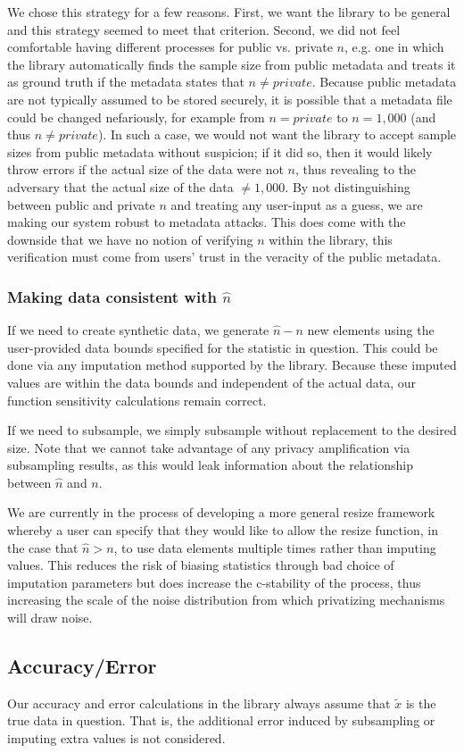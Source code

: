 \documentclass[11pt]{scrartcl} %
\begin{document}
We chose this strategy for a few reasons. First, we want the library to be general and this strategy
seemed to meet that criterion. Second, we did not feel comfortable having different processes for
public vs. private $n$, e.g. one in which the library automatically finds the sample size from public metadata and treats
it as ground truth if the metadata states that $n \neq private$.
Because public metadata are not typically assumed to be stored securely, it is
possible that a metadata file could be changed nefariously, for example from $n = private$ to $n = 1,000$
(and thus $n \neq private$).
In such a case, we would not want the library to accept sample sizes from public metadata without
suspicion; if it did so, then it would likely throw errors if the actual size of the data were not $n$, thus
revealing to the adversary that the actual size of the data $\neq 1,000$.
By not distinguishing between public and private $n$ and treating any user-input as a guess,
we are making our system robust to metadata attacks.
This does come with the downside that we have no notion of verifying $n$ within the library, this
verification must come from users' trust in the veracity of the public metadata.

\subsubsection{Making data consistent with $\hat{n}$}
If we need to create synthetic data, we generate $\hat{n} - n$ new elements using
the user-provided data bounds specified for the statistic in question.
This could be done via any imputation method supported by the library.
Because these imputed values are within the data bounds and independent of the actual data,
our function sensitivity calculations remain correct. \newline

If we need to subsample, we simply subsample without replacement to the desired size.
Note that we cannot take advantage of any privacy amplification via subsampling results,
as this would leak information about the relationship between $\hat{n}$ and $n$. \newline 

We are currently in the process of developing a more general resize framework whereby a user can specify that they would 
like to allow the resize function, in the case that $\hat{n} > n$, to use data elements multiple times rather than imputing values.
This reduces the risk of biasing statistics through bad choice of imputation parameters but does increase the c-stability of the 
process, thus increasing the scale of the noise distribution from which privatizing mechanisms will draw noise.

\subsection{Accuracy/Error}
Our accuracy and error calculations in the library always assume that $\tilde{x}$ is the true data in question.
That is, the additional error induced by subsampling or imputing extra values is not considered.



\end{document}
